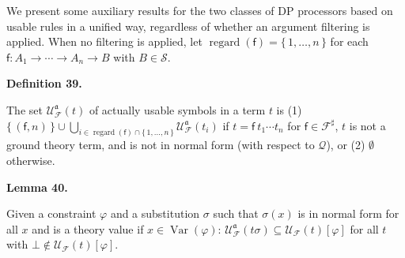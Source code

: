 \documentclass[10pt,a4paper]{amsart}
\begin{document}
 
 
We present some auxiliary results for the two classes of DP processors based on usable rules in a unified way, regardless of whether an argument filtering is applied. When no filtering is applied, let $\operatorname{regard}(\mathsf{f})=\{\,1,\ldots,n\,\}$ for each $\mathsf{f}:{A}_{1}\rightarrow\cdots\rightarrow{A}_{n}\rightarrow B$ with $B\in\mathcal{S}$.\par
 
 
 
\par\medskip\noindent\textbf{Definition 39.}\par
 
 
The set $\mathcal{U}_{\mathcal{F}}^{\mathfrak{a}}(t)$ of actually usable symbols in a term $t$ is (1) $\{\,(\mathsf{f},n)\,\}\cup\bigcup_{i\in\operatorname{regard}(\mathsf{f})\cap\{\,1,\ldots,n\,\}}\mathcal{U}_{\mathcal{F}}^{\mathfrak{a}}(t_{i})$ if $t={\mathsf{f}}\ {{t}_{1}\cdots{t}_{n}}$ for $\mathsf{f}\in\mathcal{F}^{\sharp}$, $t$ is not a ground theory term, and is not in normal form (with respect to $\mathcal{Q}$), or (2) $\emptyset$ otherwise.\par
 
 
 
 
\par\medskip\noindent\textbf{Lemma 40.}\par
 
 
Given a constraint $\varphi$ and a substitution $\sigma$ such that $\sigma(x)$ is in normal form for all $x$ and is a theory value if $x\in\operatorname{Var}(\varphi)$: $\mathcal{U}_{\mathcal{F}}^{\mathfrak{a}}(t\sigma)\subseteq\mathcal{U}_{\mathcal{F}}(t)[\varphi]$ for all $t$ with $\bot\notin\mathcal{U}_{\mathcal{F}}(t)[\varphi]$.\par
 
 
 
 
 
\end{document}
